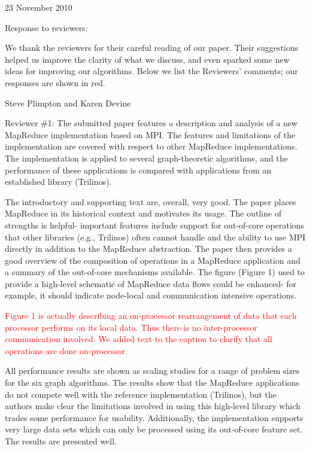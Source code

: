 \documentclass[11pt]{article}
\newcommand{\revise}[1]{\textcolor{red}{#1}}
\begin{document}
23 November 2010

Response to reviewers:

We thank the reviewers for their careful reading of our paper.  Their
suggestions helped us improve the clarity of what we discuss, and even
sparked some new ideas for improving our algorithms.  Below we list
the Reviewers' comments; our responses are shown in red.

Steve Plimpton and Karen Devine

\vspace{0.5 in}

Reviewer \#1: The submitted paper features a description and analysis of a
new MapReduce implementation based on MPI.  The features and limitations
of the implementation are covered with respect to other MapReduce
implementations.  The implementation is applied to several
graph-theoretic algorithms, and the performance of these applications
is compared with applications from an established library (Trilinos).

The introductory and supporting text are, overall, very good.  The
paper places MapReduce in its historical context and motivates its
usage.  The outline of strengths is helpful- important features
include support for out-of-core operations that other libraries (e.g.,
Trilinos) often cannot handle and the ability to use MPI directly in
addition to the MapReduce abstraction.  The paper then provides a good
overview of the composition of operations in a MapReduce application
and a summary of the out-of-core mechanisms available.  The figure
(Figure 1) used to provide a high-level schematic of MapReduce data
flows could be enhanced- for example, it should indicate node-local
and communication intensive operations.

\revise{Figure 1 is actually describing an on-processor rearrangement
of data that each processor performs on its local data.  Thus there is
no inter-processor communication involved.  We added text to the caption
to clarify that all operations are done on-processor.}

All performance results are shown as scaling studies for a range of
problem sizes for the six graph algorithms.  The results show that the
MapReduce applications do not compete well with the reference
implementation (Trilinos), but the authors make clear the limitations
involved in using this high-level library which trades some
performance for usability.  Additionally, the implementation supports
very large data sets which can only be processed using its out-of-core
feature set.  The results are presented well.
\end{document}
